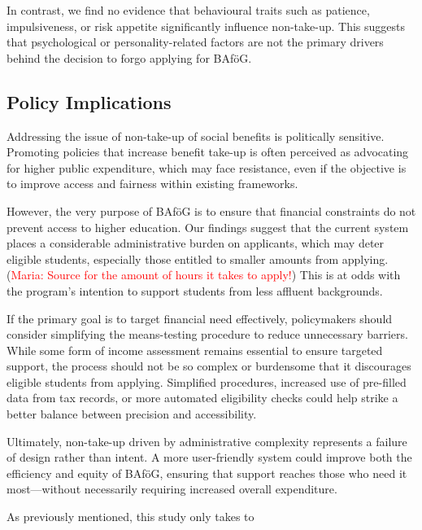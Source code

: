 In contrast, we find no evidence that behavioural traits such as patience, impulsiveness, or risk appetite significantly influence non-take-up. 
This suggests that psychological or personality-related factors are not the primary drivers behind the decision to forgo applying for BAföG.



%
%
\subsection{Policy Implications}
Addressing the issue of non-take-up of social benefits is politically sensitive. 
Promoting policies that increase benefit take-up is often perceived as advocating for higher public expenditure, which may face resistance, even if the objective is to improve access and fairness within existing frameworks.

However, the very purpose of BAföG is to ensure that financial constraints do not prevent access to higher education. 
Our findings suggest that the current system places a considerable administrative burden on applicants, which may deter eligible students, especially those entitled to smaller amounts from applying. 
(\textcolor{red}{Maria: Source for the amount of hours it takes to apply!})
This is at odds with the program's intention to support students from less affluent backgrounds.

If the primary goal is to target financial need effectively, policymakers should consider simplifying the means-testing procedure to reduce unnecessary barriers. 
While some form of income assessment remains essential to ensure targeted support, the process should not be so complex or burdensome that it discourages eligible students from applying. 
Simplified procedures, increased use of pre-filled data from tax records, or more automated eligibility checks could help strike a better balance between precision and accessibility.

Ultimately, non-take-up driven by administrative complexity represents a failure of design rather than intent. 
A more user-friendly system could improve both the efficiency and equity of BAföG, ensuring that support reaches those who need it most—without necessarily requiring increased overall expenditure.



%
%




%
%

As previously mentioned, this study only takes to 

%
%



